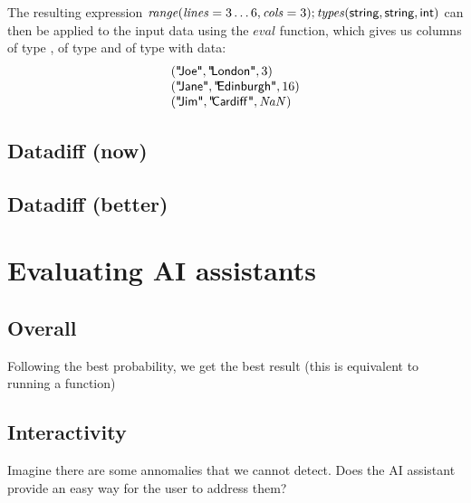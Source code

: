 \documentclass{article}
\begin{document}
The resulting expression 
$\mathit{range}(\mathit{lines}=3\ldots 6, \mathit{cols}=3); \mathit{types}(\textnormal{\sffamily string},\textnormal{\sffamily string},\textnormal{\sffamily int})$
can then be applied to the input data using the $\mathit{eval}$ function, which gives us 
columns  of type ,  of type 
and  of type  with data:
%
\begin{equation*}
\begin{array}{l}
(\textnormal{\sffamily "\hspace{-0.2em}Joe"}, \textnormal{\sffamily "\hspace{-0.2em}London"}, 3)\\
(\textnormal{\sffamily "\hspace{-0.2em}Jane"}, \textnormal{\sffamily "\hspace{-0.2em}Edinburgh"}, 16)\\
(\textnormal{\sffamily "\hspace{-0.2em}Jim"}, \textnormal{\sffamily "\hspace{-0.2em}Cardiff\hspace{0.1em}"}, \mathit{NaN})
\end{array}
\end{equation*}

\subsection{Datadiff (now)}

\subsection{Datadiff (better)}

\section{Evaluating AI assistants}

\subsection{Overall}
Following the best probability, we get the best result 
(this is equivalent to running a function)

\subsection{Interactivity}

Imagine there are some annomalies that we cannot detect.
Does the AI assistant provide an easy way for the user to address them?
\end{document}
